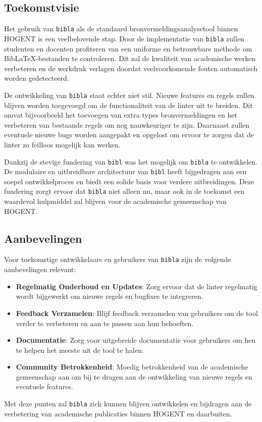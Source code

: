 \subsection{Toekomstvisie}
Het gebruik van \texttt{bibla} als de standaard bronvermeldingsanalysetool binnen HOGENT is een veelbelovende stap. Door de implementatie van \texttt{bibla} zullen studenten en docenten profiteren van een uniforme en betrouwbare methode om BibLaTeX-bestanden te controleren. Dit zal de kwaliteit van academische werken verbeteren en de werkdruk verlagen doordat veelvoorkomende fouten automatisch worden gedetecteerd.

De ontwikkeling van \texttt{bibla} staat echter niet stil. Nieuwe features en regels zullen blijven worden toegevoegd om de functionaliteit van de linter uit te breiden. Dit omvat bijvoorbeeld het toevoegen van extra types bronvermeldingen en het verbeteren van bestaande regels om nog nauwkeuriger te zijn. Daarnaast zullen eventuele nieuwe bugs worden aangepakt en opgelost om ervoor te zorgen dat de linter zo feilloos mogelijk kan werken.

Dankzij de stevige fundering van \texttt{bibl} was het mogelijk om \texttt{bibla} te ontwikkelen. De modulaire en uitbreidbare architectuur van \texttt{bibl} heeft bijgedragen aan een soepel ontwikkelproces en biedt een solide basis voor verdere uitbreidingen. Deze fundering zorgt ervoor dat \texttt{bibla} niet alleen nu, maar ook in de toekomst een waardevol hulpmiddel zal blijven voor de academische gemeenschap van HOGENT.

\subsection{Aanbevelingen}

Voor toekomstige ontwikkelaars en gebruikers van \texttt{bibla} zijn de volgende aanbevelingen relevant:
\begin{itemize}
  \item \textbf{Regelmatig Onderhoud en Updates}: Zorg ervoor dat de linter regelmatig wordt bijgewerkt om nieuwe regels en bugfixes te integreren.
  \item \textbf{Feedback Verzamelen}: Blijf feedback verzamelen van gebruikers om de tool verder te verbeteren en aan te passen aan hun behoeften.
  \item \textbf{Documentatie}: Zorg voor uitgebreide documentatie voor gebruikers om hen te helpen het meeste uit de tool te halen.
  \item \textbf{Community Betrokkenheid}: Moedig betrokkenheid van de academische gemeenschap aan om bij te dragen aan de ontwikkeling van nieuwe regels en eventuele features.
\end{itemize}

Met deze punten zal \texttt{bibla} zich kunnen blijven ontwikkelen en bijdragen aan de verbetering van academische publicaties binnen HOGENT en daarbuiten.
